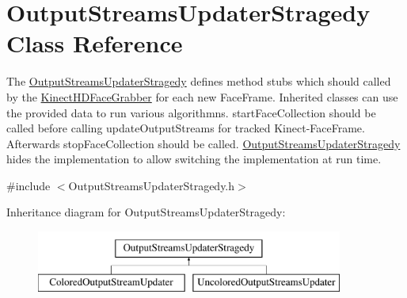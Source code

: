 \hypertarget{class_output_streams_updater_stragedy}{}\section{Output\+Streams\+Updater\+Stragedy Class Reference}
\label{class_output_streams_updater_stragedy}


The \hyperlink{class_output_streams_updater_stragedy}{Output\+Streams\+Updater\+Stragedy} defines method stubs which should called by the \hyperlink{class_kinect_h_d_face_grabber}{Kinect\+H\+D\+Face\+Grabber} for each new Face\+Frame. Inherited classes can use the provided data to run various algorithmns. start\+Face\+Collection should be called before calling update\+Output\+Streams for tracked Kinect-\/\+Face\+Frame. Afterwards stop\+Face\+Collection should be called. \hyperlink{class_output_streams_updater_stragedy}{Output\+Streams\+Updater\+Stragedy} hides the implementation to allow switching the implementation at run time.  




{\ttfamily \#include $<$Output\+Streams\+Updater\+Stragedy.\+h$>$}

Inheritance diagram for Output\+Streams\+Updater\+Stragedy\+:\begin{figure}[H]
\begin{center}
\leavevmode
\includegraphics[height=2.000000cm]{class_output_streams_updater_stragedy}
\end{center}
\end{figure}
